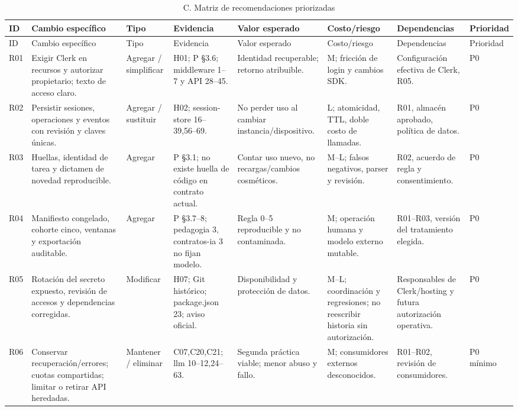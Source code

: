 \documentclass[11pt,a4paper]{report}
\begin{document}
\begin{landscape}
\small
\begin{longtable}{P{0.8cm}P{4cm}P{2cm}P{4.1cm}P{3.4cm}P{3.5cm}P{3.4cm}P{1.7cm}}
\caption{C. Matriz de recomendaciones priorizadas}\label{tab:recomendaciones}\\
\toprule ID & Cambio específico & Tipo & Evidencia & Valor esperado & Costo/riesgo & Dependencias & Prioridad \\\midrule\endfirsthead
\toprule ID & Cambio específico & Tipo & Evidencia & Valor esperado & Costo/riesgo & Dependencias & Prioridad \\\midrule\endhead
R01 & Exigir Clerk en recursos y autorizar propietario; texto de acceso claro. & Agregar / simplificar & H01; P §3.6; middleware 1--7 y API 28--45. & Identidad recuperable; retorno atribuible. & M; fricción de login y cambios SDK. & Configuración efectiva de Clerk, R05. & P0\\
R02 & Persistir sesiones, operaciones y eventos con revisión y claves únicas. & Agregar / sustituir & H02; session-store 16--39,56--69. & No perder uso al cambiar instancia/dispositivo. & L; atomicidad, TTL, doble costo de llamadas. & R01, almacén aprobado, política de datos. & P0\\
R03 & Huellas, identidad de tarea y dictamen de novedad reproducible. & Agregar & P §3.1; no existe huella de código en contrato actual. & Contar uso nuevo, no recargas/cambios cosméticos. & M--L; falsos negativos, parser y revisión. & R02, acuerdo de regla y consentimiento. & P0\\
R04 & Manifiesto congelado, cohorte cinco, ventanas y exportación auditable. & Agregar & P §3.7--8; pedagogia 3, contratos-ia 3 no fijan modelo. & Regla 0--5 reproducible y no contaminada. & M; operación humana y modelo externo mutable. & R01--R03, versión del tratamiento elegida. & P0\\
R05 & Rotación del secreto expuesto, revisión de accesos y dependencias corregidas. & Modificar & H07; Git histórico; package.json 23; aviso oficial. & Disponibilidad y protección de datos. & M--L; coordinación y regresiones; no reescribir historia sin autorización. & Responsables de Clerk/hosting y futura autorización operativa. & P0\\
R06 & Conservar recuperación/errores; cuotas compartidas; limitar o retirar API heredadas. & Mantener / eliminar & C07,C20,C21; llm 10--12,24--63. & Segunda práctica viable; menor abuso y fallo. & M; consumidores externos desconocidos. & R01--R02, revisión de consumidores. & P0 mínimo\\

\end{longtable}
\end{landscape}
\end{document}
